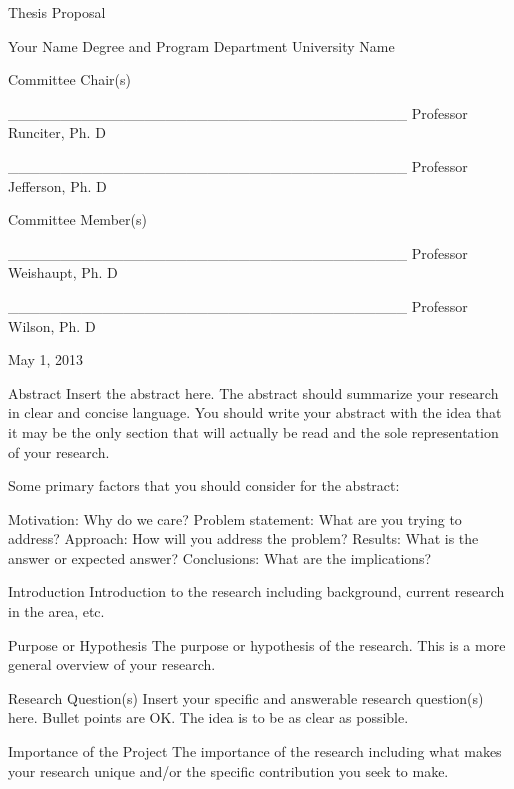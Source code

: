 
\def\mytitle{}
\def\myauthor{}
\def\latexmode{memoir}

Thesis Proposal

Your Name
Degree and Program
Department
University Name

Committee Chair(s)

\_\_\_\_\_\_\_\_\_\_\_\_\_\_\_\_\_\_\_\_\_\_\_\_\_\_\_\_\_\_\_\_\_\_\_\_\_\_
Professor Runciter, Ph. D

\_\_\_\_\_\_\_\_\_\_\_\_\_\_\_\_\_\_\_\_\_\_\_\_\_\_\_\_\_\_\_\_\_\_\_\_\_\_
Professor Jefferson, Ph. D

Committee Member(s)

\_\_\_\_\_\_\_\_\_\_\_\_\_\_\_\_\_\_\_\_\_\_\_\_\_\_\_\_\_\_\_\_\_\_\_\_\_\_
Professor Weishaupt, Ph. D

\_\_\_\_\_\_\_\_\_\_\_\_\_\_\_\_\_\_\_\_\_\_\_\_\_\_\_\_\_\_\_\_\_\_\_\_\_\_
Professor Wilson, Ph. D

May 1, 2013

\pagebreak 

Abstract
Insert the abstract here. The abstract should summarize your research in clear and concise language. You should write your abstract with the idea that it may be the only section that will actually be read and the sole representation of your research. 

Some primary factors that you should consider for the abstract:

Motivation: Why do we care?
Problem statement: What are you trying to address?
Approach: How will you address the problem?
Results: What is the answer or expected answer?
Conclusions: What are the implications?

\pagebreak 

Introduction
Introduction to the research including background, current research in the area, etc.

\pagebreak 

Purpose or Hypothesis
The purpose or hypothesis of the research. This is a more general overview of your research.

\pagebreak 

Research Question(s)
Insert your specific and answerable research question(s) here. Bullet points are OK. The idea is to be as clear as possible.

\pagebreak 

Importance of the Project
The importance of the research including what makes your research unique and\slash or the specific contribution you seek to make.

